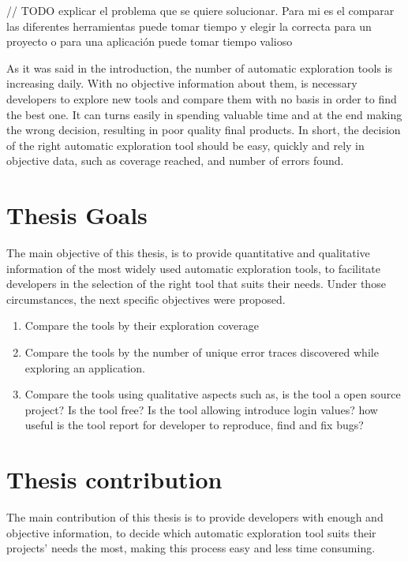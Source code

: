 // TODO explicar el problema que se quiere solucionar. Para mi es el comparar las diferentes herramientas puede tomar tiempo y elegir la correcta para un proyecto o para una aplicación puede tomar tiempo valioso


As it was said in the introduction, the number of automatic exploration tools is increasing daily. With no objective information about them, is necessary developers to explore new tools and compare them with no basis in order to find the best one. It can turns easily in spending valuable time and at the end making the wrong decision, resulting in poor quality final products. In short, the decision of the right automatic exploration tool should be easy, quickly and rely in objective data, such as coverage reached, and number of errors found.

\section{Thesis  Goals}\label{sec:thesisGoals}

The main objective of this thesis, is to provide quantitative and qualitative information of the most widely used automatic exploration tools, to facilitate developers in the selection of the right tool that suits their needs. Under those circumstances, the next specific objectives were proposed.
		\begin{enumerate}
			\item Compare the tools by their exploration coverage 
			\item Compare the tools by the number of unique error traces discovered while exploring an application.
			\item Compare the tools using qualitative aspects such as, is the tool a open source project? Is the tool free? Is the tool allowing introduce login values? how useful is the tool report for developer to reproduce, find and fix bugs?
		\end{enumerate}




\section{Thesis contribution} \label{sec:thesisContribution}

The main contribution of this thesis is to provide developers with enough and objective information, to decide which automatic exploration tool suits their projects' needs the most, making this process easy and less time consuming.


